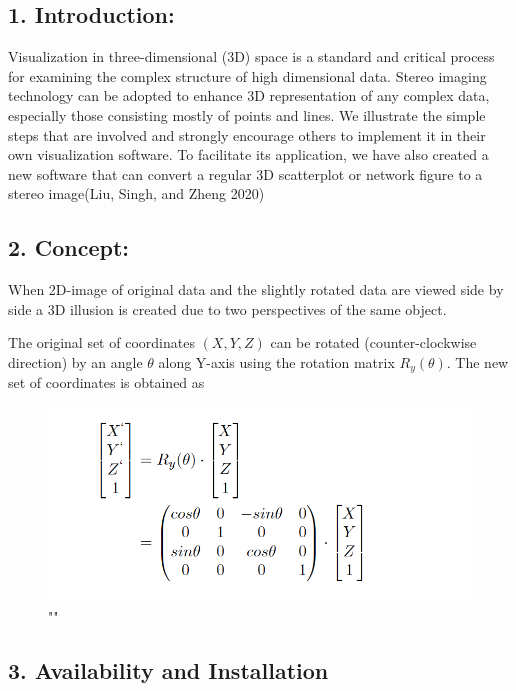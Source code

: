 \documentclass[]{article}
\author{}
\date{\vspace{-2.5em}}
\begin{document}
\hypertarget{introduction}{%
\subsection{1. Introduction:}\label{introduction}}

Visualization in three-dimensional (3D) space is a standard and critical
process for examining the complex structure of high dimensional data.
Stereo imaging technology can be adopted to enhance 3D representation of
any complex data, especially those consisting mostly of points and
lines. We illustrate the simple steps that are involved and strongly
encourage others to implement it in their own visualization software. To
facilitate its application, we have also created a new software that can
convert a regular 3D scatterplot or network figure to a stereo
image(Liu, Singh, and Zheng 2020)

\hypertarget{concept}{%
\subsection{2. Concept:}\label{concept}}

When 2D-image of original data and the slightly rotated data are viewed
side by side a 3D illusion is created due to two perspectives of the
same object.

The original set of coordinates \((X, Y, Z)\) can be rotated
(counter-clockwise direction) by an angle \(\theta\) along Y-axis using
the rotation matrix \(R_y (\theta)\). The new set of coordinates is
obtained as

\begin{figure}
\centering
\includegraphics{./equation.png}
\caption{""}
\end{figure}

\hypertarget{availability-and-installation}{%
\subsection{3. Availability and
Installation}\label{availability-and-installation}}
\end{document}
